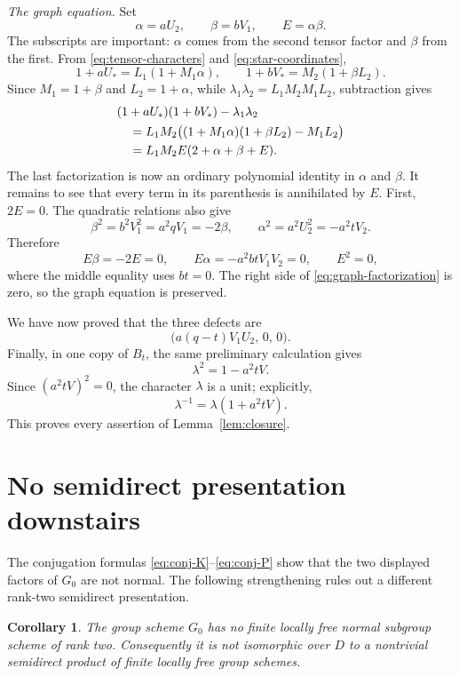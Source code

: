 \documentclass[11pt]{amsart}
\newtheorem{corollary}[theorem]{Corollary}
\theoremstyle{remark}
\begin{document}
\smallskip
\noindent\emph{The graph equation.}
Set
\[
 \alpha=aU_2,\qquad
 \beta=bV_1,\qquad
 E=\alpha\beta.
\]
The subscripts are important: \(\alpha\) comes from the second tensor
factor and \(\beta\) from the first.  From
\eqref{eq:tensor-characters} and \eqref{eq:star-coordinates},
\[
 1+aU_*=L_1(1+M_1\alpha),
 \qquad
 1+bV_*=M_2(1+\beta L_2).
\]
Since \(M_1=1+\beta\) and \(L_2=1+\alpha\), while
\(\lambda_1\lambda_2=L_1M_2M_1L_2\), subtraction gives
\begin{align}
 &(1+aU_*)(1+bV_*)-\lambda_1\lambda_2\notag\\
 &\quad=
 L_1M_2
 \bigl(
  (1+M_1\alpha)(1+\beta L_2)-M_1L_2
 \bigr)\notag\\
 &\quad=
 L_1M_2E(2+\alpha+\beta+E).
 \label{eq:graph-factorization}
\end{align}
The last factorization is now an ordinary polynomial identity in
\(\alpha\) and \(\beta\).  It remains to see that every term in its
parenthesis is annihilated by \(E\).  First, \(2E=0\).  The quadratic
relations also give
\[
 \beta^2
 =b^2V_1^2
 =a^2qV_1
 =-2\beta,
 \qquad
 \alpha^2
 =a^2U_2^2
 =-a^2tV_2.
\]
Therefore
\[
 E\beta=-2E=0,
 \qquad
 E\alpha=-a^2btV_1V_2=0,
 \qquad
 E^2=0,
\]
where the middle equality uses \(bt=0\).  The right side of
\eqref{eq:graph-factorization} is zero, so the graph equation is
preserved.

We have now proved that the three defects are
\[
 \bigl(a(q-t)V_1U_2,\,0,\,0\bigr).
\]
Finally, in one copy of \(B_t\), the same preliminary calculation gives
\[
 \lambda^2=1-a^2tV.
\]
Since \((a^2tV)^2=0\), the character \(\lambda\) is a unit; explicitly,
\[
 \lambda^{-1}=\lambda(1+a^2tV).
\]
This proves every assertion of Lemma~\ref{lem:closure}.
\section{No semidirect presentation downstairs}
\label{app:no-semidirect}

The conjugation formulas \eqref{eq:conj-K}--\eqref{eq:conj-P} show
that the two displayed factors of \(G_0\) are not normal.  The following
strengthening rules out a different rank-two semidirect presentation.

\begin{corollary}\label{cor:no-semidirect}
The group scheme \(G_0\) has no finite locally free normal subgroup
scheme of rank two.  Consequently it is not isomorphic over \(D\) to a
nontrivial semidirect product of finite locally free group schemes.
\end{corollary}
\end{document}
